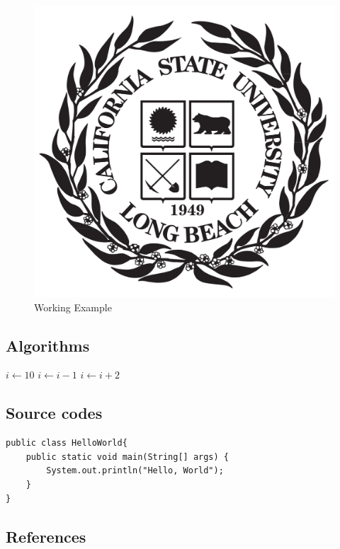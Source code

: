 \documentclass{article}
\begin{document}
\begin{figure}[ht]
    \centering
    \includegraphics[scale = 0.1]{fig1.png}
    \caption{Working Example}
    \label{fig: figure1}
\end{figure}



\subsection{Algorithms}
\begin{algorithmic}
\STATE $i\gets 10$
        \STATE $i\gets i-1$
\ELSE
                \STATE $i\gets i+2$
        \ENDIF
\ENDIF 
\end{algorithmic}


\subsection{Source codes}
\begin{verbatim}
public class HelloWorld{
    public static void main(String[] args) {
        System.out.println("Hello, World");
    }
}
\end{verbatim}

\subsection{References}
\end{document}
